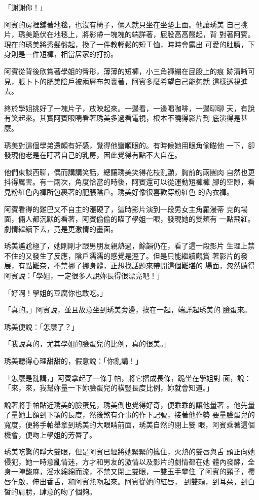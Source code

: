 「謝謝你！」

阿賓的房裡舖著地毯，也沒有椅子，倆人就只坐在坐墊上面。他讓琇美
自己挑片，琇美跪伏在地毯上，將影帶一塊塊的端詳著，屁股高高翹起，背
對著阿賓。現在的琇美將秀髮盤起，換了一件教輕鬆的短Ｔ恤，時時會露出
可愛的肚臍，下身則是一件短褲，相當居家的打扮。

阿賓從背後欣賞著學姐的臀形，薄薄的短褲，小三角褲繃在屁股上的痕
跡清晰可見，脹卜卜的肥美陰戶被兩層布包裹著，阿賓多麼希望自己能夠就
這樣透視進去。

終於學姐挑好了一塊片子，放映起來。一邊看，一邊喝咖啡，一邊聊聊
天，有說有笑起來。其實阿賓眼睛看著琇美多過看電視，根本不曉得影片到
底演得是甚麼。

琇美對這個學弟還頗有好感，覺得他蠻順眼的。有時候她用眼角偷瞄他
一下，卻發現他老是在盯著自己的乳房，因此覺得有點不大自在。

他們東談西聊，偶而講講笑話，總讓琇美笑得花枝亂顫，胸前的兩團肉
自然也更抖得厲害。有一兩次，角度恰當的時後，阿賓還可以從運動短褲褲
腳的空隙，看見粉紅色內褲所包裹著的肥脹陰戶。琇美好像很喜歡穿粉紅色
的內衣褲。

阿賓看得的雞巴又不自主的漲硬了，這時影片演到一段男女主角羅漫蒂
克的場面，倆人都沉默的看著，阿賓偷偷的瞄了學姐一眼，發現她的雙頰有
一點飛紅。劇情繼續下去，竟是更激情的畫面。

琇美尷尬極了，她剛剛才跟男朋友親熱過，餘韻仍在，看了這一段影片
生理上禁不住的又發生了反應，陰戶濡濡的感覺是溼了。但是只能繼續觀賞
著影片的發展，有點難奈，不禁挪了挪身體，正想找話題來帶開這個難堪的
場面，忽然聽得阿賓說：「學姐，一定很多人說妳長得很漂亮吧！」

「好啊！學姐的豆腐你也敢吃。」

「真的。」阿賓說，並且故意坐到琇美旁邊，挨在一起，端詳起琇美的
臉蛋來。

琇美便說：「怎麼了？」

「我說真的，尤其學姐的臉蛋兒的比例，真的很美。」

琇美聽得心理甜甜的，假意說：「你亂講！」

「怎麼是亂講，」阿賓拿起了一條手帕，將它摺成長條，跪坐在學姐對
面，說：「來，來，我幫妳量一下妳臉蛋兒的橫豎長度比例，妳就會知道。」

說著將手帕貼近琇美的臉蛋兒，琇美倒也覺得好奇，便乖乖的讓他量著
。他先量了量她上額到下顎的長度，然後煞有介事的作下記號，接著他作勢
要量臉蛋兒的寬度，便將手帕舉拿到琇美的大眼睛前面，琇美自然的閉上雙
眼，阿賓乘著這個機會，便吻上學姐的芳唇了。

琇美吃驚的睜大雙眼，但是阿賓已經將她緊緊的擁住，火熱的雙唇與舌
頭正向她侵犯，她一時意亂情迷，方才和男友的激情以及影片的劇情都在她
體內發酵，全身一陣酸麻，淫水綿綿而流，不禁又閉上雙眼，一雙玉手攀住
了阿賓的頸子，櫻唇乍啟，伸出香舌，和阿賓熱吻起來。阿賓從她的紅唇，
到雙頰，到耳朵，到白皙的肩膀，肆意的吻了個夠。

